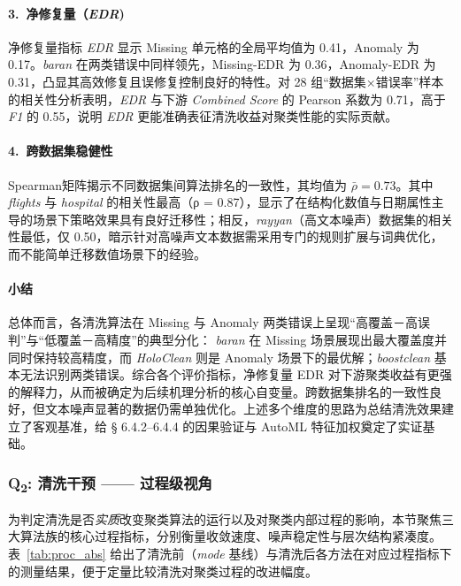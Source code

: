 \documentclass[10pt]{article} %
\numberwithin{equation}{section}
\begin{document}
\paragraph{3.~净修复量（\textit{EDR})}
净修复量指标 \textit{EDR} 显示 Missing 单元格的全局平均值为 0.41，Anomaly 为 0.17。\textit{baran} 在两类错误中同样领先，Missing-EDR 为 0.36，Anomaly-EDR 为 0.31，凸显其高效修复且误修复控制良好的特性。对 28 组“数据集×错误率”样本的相关性分析表明，\textit{EDR} 与下游 \textit{Combined Score} 的 Pearson 系数为 0.71，高于 \textit{F1} 的 0.55，\textcolor[rgb]{0.00,0.07,1.00}{说明 \textit{EDR} 更能准确表征清洗收益对聚类性能的实际贡献。}

\paragraph{4.~跨数据集稳健性}
Spearman矩阵揭示不同数据集间算法排名的一致性，其均值为 $\bar\rho=0.73$。其中 \emph{flights} 与 \emph{hospital} 的相关性最高（ρ = 0.87），显示了在结构化数值与日期属性主导的场景下策略效果具有良好迁移性；相反，\emph{rayyan}（高文本噪声）数据集的相关性最低，仅 0.50，\textcolor[rgb]{0.00,0.07,1.00}{暗示针对高噪声文本数据需采用专门的规则扩展与词典优化，而不能简单迁移数值场景下的经验。}

\paragraph{小结}
\textcolor[rgb]{0.00,0.07,1.00}{总体而言，各清洗算法在 Missing 与 Anomaly 两类错误上呈现“高覆盖－高误判”与“低覆盖－高精度”的典型分化： \textit{baran} 在 Missing 场景展现出最大覆盖度并同时保持较高精度，而 \textit{HoloClean} 则是 Anomaly 场景下的最优解；\textit{boostclean} 基本无法识别两类错误。综合各个评价指标，净修复量 EDR 对下游聚类收益有更强的解释力，从而被确定为后续机理分析的核心自变量。跨数据集排名的一致性良好，但文本噪声显著的数据仍需单独优化。上述多个维度的思路为总结清洗效果建立了客观基准，给 § 6.4.2–6.4.4 的因果验证与 AutoML 特征加权奠定了实证基础。}


\subsubsection{Q\textsubscript{2}: 清洗干预 —— 过程级视角}
\label{subsec:internal_tracking}
为判定清洗是否\emph{实质}改变聚类算法的运行以及对聚类内部过程的影响，本节聚焦三大算法族的核心过程指标，分别衡量收敛速度、噪声稳定性与层次结构紧凑度。
表~\ref{tab:proc_abs} 给出了清洗前（\textit{mode} 基线）与清洗后各方法在对应过程指标下的测量结果，便于定量比较清洗对聚类过程的改进幅度。
\end{document}

